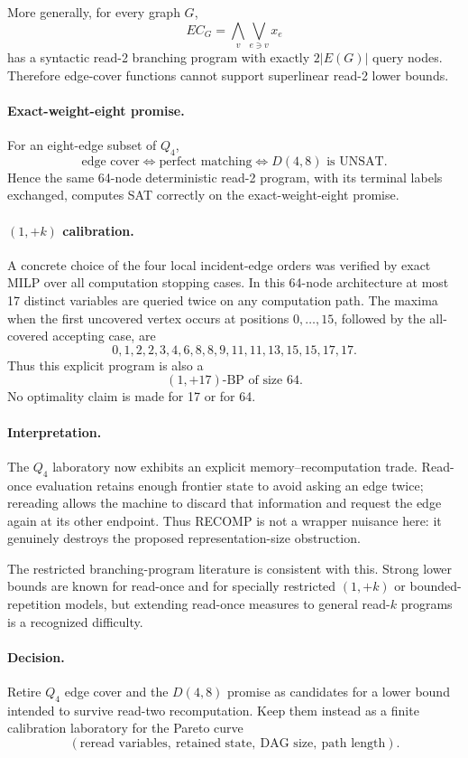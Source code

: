 More generally, for every graph $G$,
\[
EC_G=\bigwedge_v\bigvee_{e\ni v}x_e
\]
has a syntactic read-2 branching program with exactly $2|E(G)|$ query nodes.  Therefore
edge-cover functions cannot support superlinear read-2 lower bounds.

\paragraph{Exact-weight-eight promise.}
For an eight-edge subset of $Q_4$,
\[
\text{edge cover}
\iff
\text{perfect matching}
\iff
D(4,8)\text{ is UNSAT}.
\]
Hence the same 64-node deterministic read-2 program, with its terminal labels exchanged,
computes SAT correctly on the exact-weight-eight promise.

\paragraph{$(1,+k)$ calibration.}
A concrete choice of the four local incident-edge orders was verified by exact MILP over all
computation stopping cases.  In this 64-node architecture at most 17 distinct variables are
queried twice on any computation path.  The maxima when the first uncovered vertex occurs at
positions $0,\ldots,15$, followed by the all-covered accepting case, are
\[
0,1,2,2,3,4,6,8,8,9,11,11,13,15,15,17,17.
\]
Thus this explicit program is also a
\[
\boxed{(1,+17)\text{-BP of size }64}.
\]
No optimality claim is made for 17 or for 64.

\paragraph{Interpretation.}
The $Q_4$ laboratory now exhibits an explicit memory--recomputation trade.  Read-once
evaluation retains enough frontier state to avoid asking an edge twice; rereading allows the
machine to discard that information and request the edge again at its other endpoint.  Thus
RECOMP is not a wrapper nuisance here: it genuinely destroys the proposed representation-size
obstruction.

The restricted branching-program literature is consistent with this.  Strong lower bounds are
known for read-once and for specially restricted $(1,+k)$ or bounded-repetition models, but
extending read-once measures to general read-$k$ programs is a recognized difficulty.

\paragraph{Decision.}
Retire $Q_4$ edge cover and the $D(4,8)$ promise as candidates for a lower bound intended to
survive read-two recomputation.  Keep them instead as a finite calibration laboratory for the
Pareto curve
\[
(\text{reread variables},\ \text{retained state},\ \text{DAG size},\ \text{path length}).
\]

